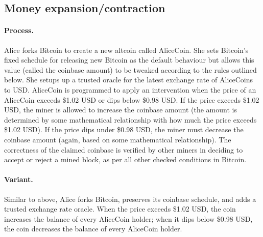 

\subsection{Money expansion/contraction}


\paragraph{Process.} Alice forks Bitcoin to create a new altcoin called AliceCoin. She sets Bitcoin's fixed schedule for releasing new Bitcoin as the default behaviour but allows this value (called the coinbase amount) to be tweaked according to the rules outlined below. She setups up a trusted oracle for the latest exchange rate of AliceCoins to USD. AliceCoin is programmed to apply an intervention when the price of an AliceCoin exceeds \$1.02 USD or dips below \$0.98 USD. If the price exceeds \$1.02 USD, the miner is allowed to increase the coinbase amount (the amount is determined by some mathematical relationship with how much the price exceeds \$1.02 USD). If the price dips under \$0.98 USD, the miner must decrease the coinbase amount (again, based on some mathematical relationship). The correctness of the claimed coinbase is verified by other miners in deciding to accept or reject a mined block, as per all other checked conditions in Bitcoin.

\paragraph{Variant.} Similar to above, Alice forks Bitcoin, preserves its coinbase schedule, and adds a trusted exchange rate oracle. When the price exceeds \$1.02 USD, the coin increases the balance of every AliceCoin holder; when it dips below \$0.98 USD, the coin decreases the balance of every AliceCoin holder.



